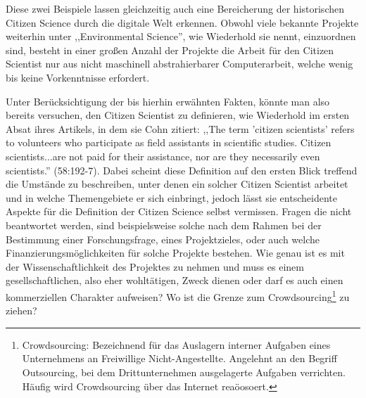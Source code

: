 \documentclass{article}
\begin{document}
Diese zwei Beispiele lassen gleichzeitig auch eine Bereicherung der historischen Citizen Science durch die digitale Welt erkennen.
Obwohl viele bekannte Projekte weiterhin unter ,,Environmental Science'', wie Wiederhold sie nennt, einzuordnen sind,
besteht in einer großen Anzahl der Projekte die Arbeit für den Citizen Scientist nur aus nicht maschinell abstrahierbarer Computerarbeit,
welche wenig bis keine Vorkenntnisse erfordert.

Unter Berücksichtigung der bis hierhin erwähnten Fakten, könnte man also bereits versuchen, den Citizen Scientist zu definieren, wie Wiederhold im ersten Absat ihres Artikels,
in dem sie Cohn zitiert: ,,The term 'citizen scientists' refers to volunteers who participate as field assistants in scientific studies.
Citizen scientists...are not paid for their assistance, nor are they necessarily even scientists.'' \cite{Cohn} (58:192-7).
Dabei scheint diese Definition auf den ersten Blick treffend die Umstände zu beschreiben,
unter denen ein solcher Citizen Scientist arbeitet und in welche Themengebiete er sich einbringt, jedoch lässt sie entscheidente Aspekte für die Definition der Citizen Science selbst vermissen.
Fragen die nicht beantwortet werden, sind beispielsweise solche nach dem Rahmen bei der Bestimmung einer Forschungsfrage,
eines Projektzieles, oder auch welche Finanzierungsmöglichkeiten für solche Projekte bestehen.
Wie genau ist es mit der Wissenschaftlichkeit des Projektes zu nehmen und muss es einem gesellschaftlichen, also eher wohltätigen,
Zweck dienen oder darf es auch einen kommerziellen Charakter aufweisen?
Wo ist die Grenze zum Crowdsourcing\footnote{Crowdsourcing: Bezeichnend für das Auslagern interner Aufgaben eines Unternehmens an Freiwillige Nicht-Angestellte.
Angelehnt an den Begriff Outsourcing, bei dem Drittunternehmen ausgelagerte Aufgaben verrichten. Häufig wird Crowdsourcing über das Internet reaöosoert.} zu ziehen?
\end{document}
